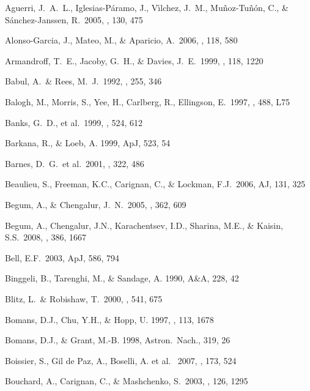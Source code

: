 \documentclass[12pt,onecolumn]{emulateapj}
\begin{document}
\begin{thebibliography}{}

Aguerri, J.~A.~L., Iglesias-P{\'a}ramo, J., V{\'{\i}}lchez, J.~M., 
Mu{\~n}oz-Tu{\~n}{\'o}n, C., \& S{\'a}nchez-Janssen, R.\ 2005, \aj, 130, 475 

Alonso-Garcia, J., Mateo, M., \& Aparicio, A.\ 2006, \pasp, 118, 580

Armandroff, T.~E., Jacoby, G.~H., \& Davies, J.~E.\ 1999, \aj, 118, 1220

Babul, A.~\& Rees, M.~J.\ 1992, \mnras, 255, 346 

Balogh, M., Morris, S., Yee, H., Carlberg, R., Ellingson, E.\ 1997, \apj, 488, L75 

Banks, G.~D., et al.\ 1999, \apj, 524, 612 

Barkana, R., \& Loeb, A. 1999, ApJ, 523, 54

Barnes, D.~G.~et al.\ 2001, \mnras, 322, 486 

Beaulieu, S., Freeman, K.C., Carignan, C., \&  Lockman, F.J.\ 2006, AJ, 131, 325 

Begum, A., \& Chengalur, J.~N.\ 2005, \mnras, 362, 609 

Begum, A., Chengalur, J.N., Karachentsev, I.D., Sharina, M.E., \& Kaisin, S.S.\ 2008, \mnras, 386, 1667

Bell, E.F.\ 2003, ApJ, 586, 794

Binggeli, B., Tarenghi, M., \& Sandage, A. 1990, A\&A, 228, 42

Blitz, L.~\& Robishaw, T.\ 2000, \apj, 541, 675 

Bomans, D.J., Chu, Y.H., \& Hopp, U. 1997, \aj , 113, 1678

Bomans, D.J., \& Grant, M.-B. 1998, Astron.\ Nach., 319, 26

Boissier, S., Gil de Paz, A., Boselli, A. et al. \ 2007, \apj, 173, 524 

Bouchard, A., Carignan, C., \& Mashchenko, S.\ 2003, \aj, 126, 1295 


\end{thebibliography}
\end{document}
